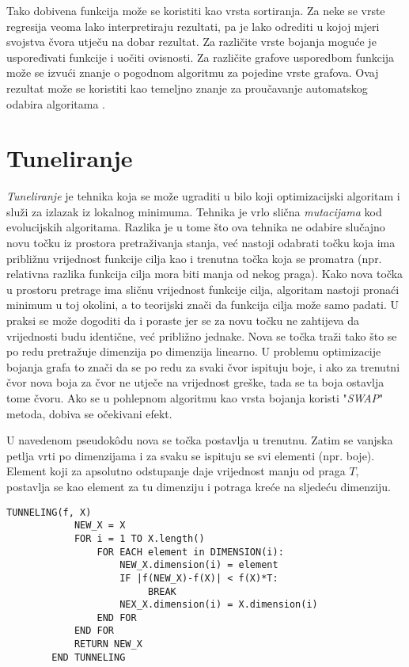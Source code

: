 \documentclass[times, utf8, diplomski, numeric]{fer}
\begin{document}
Tako dobivena funkcija može se koristiti kao vrsta sortiranja. Za neke se vrste regresija veoma lako interpretiraju rezultati, pa je lako odrediti u kojoj mjeri svojstva čvora utječu na dobar rezultat. Za različite vrste bojanja moguće je uspoređivati funkcije i uočiti ovisnosti. Za različite grafove usporedbom funkcija može se izvući znanje o pogodnom algoritmu za pojedine vrste grafova. Ovaj rezultat može se koristiti kao temeljno znanje za proučavanje automatskog odabira algoritama \cite{lit14}.

\section{Tuneliranje}

\emph{Tuneliranje} je tehnika koja se može ugraditi u bilo koji optimizacijski algoritam i služi za izlazak iz lokalnog minimuma. Tehnika je vrlo slična \emph{mutacijama} kod evolucijskih algoritama. Razlika je u tome što ova tehnika ne odabire slučajno novu točku iz prostora pretraživanja stanja, već nastoji odabrati točku koja ima približnu vrijednost funkcije cilja kao i trenutna točka koja se promatra (npr. relativna razlika funkcija cilja mora biti manja od nekog praga). Kako nova točka u prostoru pretrage ima sličnu vrijednost funkcije cilja, algoritam nastoji pronaći minimum u toj okolini, a to teorijski znači da funkcija cilja može samo padati. U praksi se može dogoditi da i poraste jer se za novu točku ne zahtijeva da vrijednosti budu identične, već približno jednake. Nova se točka traži tako što se po redu pretražuje dimenzija po dimenzija linearno. U problemu optimizacije bojanja grafa to znači da se po redu za svaki čvor ispituju boje, i ako za trenutni čvor nova boja za čvor ne utječe na vrijednost greške, tada se ta boja ostavlja tome čvoru. Ako se u pohlepnom algoritmu kao vrsta bojanja koristi "\emph{SWAP}" metoda, dobiva se očekivani efekt. 

U navedenom pseudok\^{o}du nova se točka postavlja u trenutnu. Zatim se vanjska petlja vrti po dimenzijama i za svaku se ispituju se svi elementi (npr. boje). Element koji za apsolutno odstupanje daje vrijednost manju od praga $T$, postavlja se kao element za tu dimenziju i potraga kreće na sljedeću dimenziju.

\begin{singlespace}
	\begin{lstlisting}[caption=Metoda tuneliranja - implementacija]
		TUNNELING(f, X)
			NEW_X = X
			FOR i = 1 TO X.length()
				FOR EACH element in DIMENSION(i):
					NEW_X.dimension(i) = element
					IF |f(NEW_X)-f(X)| < f(X)*T:
						 BREAK
					NEX_X.dimension(i) = X.dimension(i)
				END FOR
			END FOR
			RETURN NEW_X
		END TUNNELING
	\end{lstlisting}
\end{singlespace}
\end{document}
